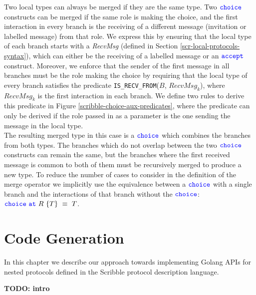 \documentclass[12pt,twoside]{report}
\begin{document}
Two local types can always be merged if they are the same type. Two ${\color{blue}\mathtt{choice}}$ constructs can be merged if the same role is making the choice, and the first interaction in every branch is the receiving of a different message (invitation or labelled message) from that role. We express this by ensuring that the local type of each branch starts with a \textit{RecvMsg} (defined in Section \ref{scr-local-protocols-syntax}), which can either be the receiving of a labelled message or an ${\color{blue}\mathtt{accept}}$ construct. Moreover, we enforce that the sender of the first message in all branches must be the role making the choice by requiring that the local type of every branch satisfies the predicate \texttt{IS\_RECV\_FROM}($\mathit{B}$, $\mathit{RecvMsg_k}$), where $\mathit{RecvMsg_k}$ is the first interaction in each branch. We define two rules to derive this predicate in Figure \ref{scribble-choice-aux-predicates}, where the predicate can only be derived if the role passed in as a parameter is the one sending the message in the local type.\\

The resulting merged type in this case is a ${\color{blue}\mathtt{choice}}$ which combines the branches from both types. The branches which do not overlap between the two ${\color{blue}\mathtt{choice}}$ constructs can remain the same, but the branches where the first received message is common to both of them must be recursively merged to produce a new type. To reduce the number of cases to consider in the definition of the merge operator we implicitly use the equivalence between a ${\color{blue}\mathtt{choice}}$ with a single branch and the interactions of that branch without the ${\color{blue}\mathtt{choice}}$: ${\color{blue}\mathtt{choice}}\ {\color{blue}\mathtt{at}}\ R\ \{T\}\ \equiv\ T$.\\
 
\chapter{Code Generation}

In this chapter we describe our approach towards implementing Golang APIs for nested protocols defined in the Scribble protocol description language. 

\textbf{TODO: intro}
\end{document}
